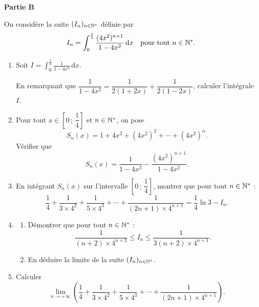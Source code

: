 \bigskip
\noindent\textbf{Partie B}

On considère la suite $(I_n)_{n \in \mathbb{N}^*}$ définie par
$$
I_n = \int_0^{\frac{1}{4}} \frac{(4x^2)^{n+1}}{1 - 4x^2}\,\mathrm{d}x
\quad \text{pour tout } n \in \mathbb{N}^*.
$$

\begin{enumerate}
	\item Soit $I = \displaystyle\int_0^{\frac{1}{4}} \frac{1}{1 - 4x^2}\,\mathrm{d}x$.

	En remarquant que $\dfrac{1}{1-4x^2} = \dfrac{1}{2(1+2x)} + \dfrac{1}{2(1-2x)}$,
	calculer l'intégrale $I$.

	\item Pour tout $x \in \left[0\,;\,\dfrac{1}{4}\right]$ et $n \in \mathbb{N}^*$, on pose
	$$
	S_n(x) = 1 + 4x^2 + (4x^2)^2 + \cdots + (4x^2)^n.
	$$
	Vérifier que
	$$
	S_n(x) = \frac{1}{1-4x^2} - \frac{(4x^2)^{n+1}}{1-4x^2}.
	$$

	\item En intégrant $S_n(x)$ sur l'intervalle $\left[0\,;\,\dfrac{1}{4}\right]$,
	montrer que pour tout $n \in \mathbb{N}^*$ :
	$$
	\frac{1}{4} + \frac{1}{3 \times 4^2} + \frac{1}{5 \times 4^3}
	+ \cdots + \frac{1}{(2n+1) \times 4^{n+1}}
	= \frac{1}{4}\ln 3 - I_n.
	$$

	\item
	\begin{enumerate}
		\item Démontrer que pour tout $n \in \mathbb{N}^*$ :
		$$
		\frac{1}{(n+2) \times 4^{n+2}} \leqslant I_n \leqslant \frac{1}{3(n+2) \times 4^{n+1}}.
		$$
		\item En déduire la limite de la suite $(I_n)_{n \in \mathbb{N}^*}$.
	\end{enumerate}

	\item Calculer
	$$
	\lim_{n \to +\infty}
	\left(
	\frac{1}{4} + \frac{1}{3 \times 4^2} + \frac{1}{5 \times 4^3}
	+ \cdots + \frac{1}{(2n+1) \times 4^{n+1}}
	\right).
	$$
\end{enumerate}
